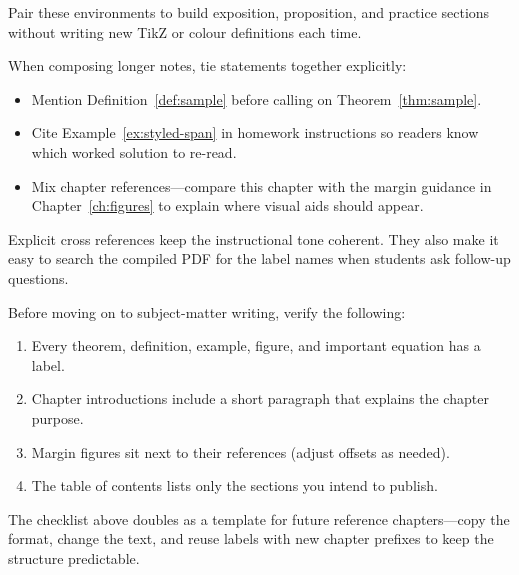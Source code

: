 Pair these environments to build exposition, proposition, and practice sections
without writing new TikZ or colour definitions each time.

\label{sec:layering-crossrefs}

When composing longer notes, tie statements together explicitly:
\begin{itemize}[leftmargin=1.8em]
  \item Mention Definition~\ref{def:sample} before calling on Theorem~\ref{thm:sample}.
  \item Cite Example~\ref{ex:styled-span} in homework instructions so readers know
        which worked solution to re-read.
  \item Mix chapter references—compare this chapter with the margin guidance in
        Chapter~\ref{ch:figures} to explain where visual aids should appear.
\end{itemize}

Explicit cross references keep the instructional tone coherent. They also make it
easy to search the compiled PDF for the label names when students ask follow-up
questions.

\label{sec:author-checklist}

Before moving on to subject-matter writing, verify the following:
\begin{enumerate}[leftmargin=1.8em]
  \item Every theorem, definition, example, figure, and important equation has a label.
  \item Chapter introductions include a short paragraph that explains the chapter purpose.
  \item Margin figures sit next to their references (adjust offsets as needed).
  \item The table of contents lists only the sections you intend to publish.
\end{enumerate}

The checklist above doubles as a template for future reference chapters—copy the
format, change the text, and reuse labels with new chapter prefixes to keep the
structure predictable.
